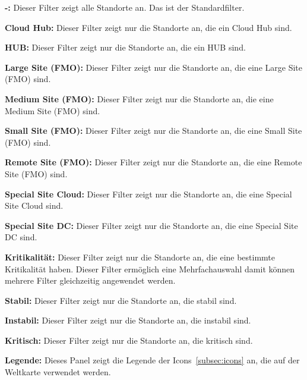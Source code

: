 \begin{compactitem}
\begin{compactitem}
        \begin{compactitem}
           \item \textbf{-:} Dieser Filter zeigt alle Standorte an. Das ist der Standardfilter.
           \item \textbf{Cloud Hub:} Dieser Filter zeigt nur die Standorte an, die ein Cloud Hub sind.
           \item \textbf{HUB:} Dieser Filter zeigt nur die Standorte an, die ein HUB sind.
           \item \textbf{Large Site (FMO):} Dieser Filter zeigt nur die Standorte an, die eine Large Site (FMO) sind.
           \item \textbf{Medium Site (FMO):} Dieser Filter zeigt nur die Standorte an, die eine Medium Site (FMO) sind.
           \item \textbf{Small Site (FMO):} Dieser Filter zeigt nur die Standorte an, die eine Small Site (FMO) sind.
           \item \textbf{Remote Site (FMO):} Dieser Filter zeigt nur die Standorte an, die eine Remote Site (FMO) sind.
           \item \textbf{Special Site Cloud:} Dieser Filter zeigt nur die Standorte an, die eine Special Site Cloud sind.
           \item \textbf{Special Site DC:} Dieser Filter zeigt nur die Standorte an, die eine Special Site DC sind.
        \end{compactitem}

        \item \textbf{Kritikalität:} Dieser Filter zeigt nur die Standorte an, die eine bestimmte Kritikalität haben.
        Dieser Filter ermöglich eine Mehrfachauswahl damit können mehrere Filter gleichzeitig angewendet werden.

        \begin{compactitem}
            \item \textbf{Stabil:} Dieser Filter zeigt nur die Standorte an, die stabil sind.
            \item \textbf{Instabil:} Dieser Filter zeigt nur die Standorte an, die instabil sind.
            \item \textbf{Kritisch:} Dieser Filter zeigt nur die Standorte an, die kritisch sind.
        \end{compactitem}

    \end{compactitem}
    
    \item \textbf{Legende:} Dieses Panel zeigt die Legende der Icons~\ref{subsec:icons} an, die auf der Weltkarte verwendet werden.

\end{compactitem}


